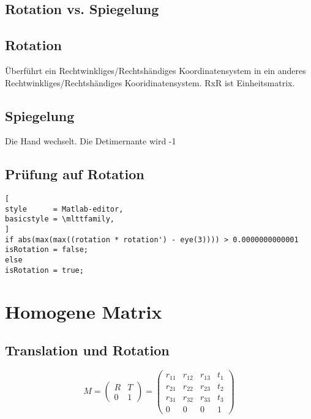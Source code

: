 \subsection{Rotation vs. Spiegelung}

	\subsection{Rotation}
 		Überführt ein Rechtwinkliges/Rechtshändiges Koordinatensystem in ein anderes Rechtwinkliges/Rechtshändiges Kooridinatensystem. RxR ist Einheitsmatrix.
 	\subsection{Spiegelung}
		Die Hand wechselt. Die Detimernante wird -1

\subsection{Prüfung auf Rotation}

\begin{lstlisting}[
style      = Matlab-editor,
basicstyle = \mlttfamily,
]
if abs(max(max((rotation * rotation') - eye(3)))) > 0.0000000000001
isRotation = false;
else
isRotation = true;

\end{lstlisting}


\section{Homogene Matrix}
\label{chp:MathematischeGrundlagen:sec:HomogeneMatrix}

\subsection{Translation und Rotation}
\begin{equation}
	M = 
	\left(
	\begin{array}{cc}
		R & T\\
		0 & 1
	\end{array}
	\right)
	=
	\left(
	\begin{array}{cccc}
		r_{11} & r_{12} & r_{13} & t_{1} \\
		r_{21} & r_{22} & r_{23} & t_{2} \\
		r_{31} & r_{32} & r_{33} & t_{3} \\
		0 	   & 0    & 0    & 1  
	\end{array}
	\right)	
\end{equation}

